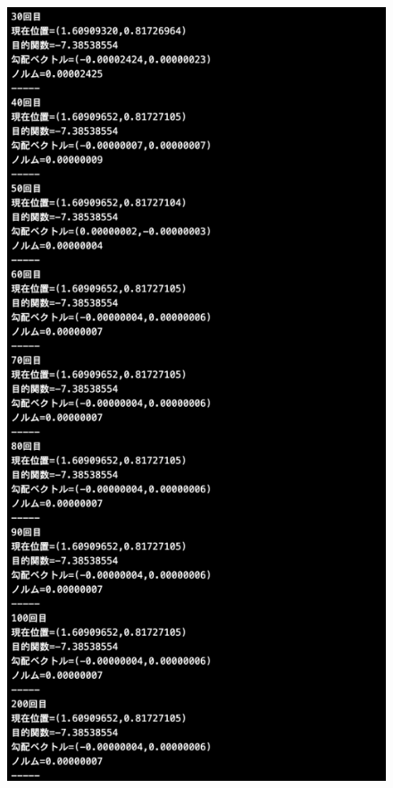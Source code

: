 \documentclass[12pt]{jarticle}
\begin{document}
\begin{figure}[h]
    \begin{minipage}{0.5\hsize}
        \begin{center}
            \includegraphics[scale=0.2]{kadai1_1s_out3_1_2.png}
        \end{center}

\end{minipage}
\end{figure}
\end{document}
